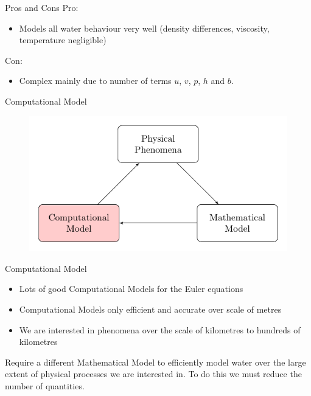 \documentclass[pdf]{beamer}
\begin{document}
\begin{frame}{Pros and Cons}
	Pro:
	\begin{itemize}
		\item Models all water behaviour very well (density differences, viscosity, temperature negligible)
	\end{itemize}
	Con:
	\begin{itemize}
		\item Complex mainly due to number of terms $u$, $v$, $p$, $h$ and $b$. 
	\end{itemize}
\end{frame}
\begin{frame}{Computational Model}
\begin{figure}
	\includegraphics[width=\textwidth]{./Pics/ModelDiagrams/FlowChartHigh3.pdf}
\end{figure}
\end{frame}
\begin{frame}{Computational Model}
	\begin{itemize}
		\item Lots of good Computational Models for the Euler equations
		\item Computational Models only efficient and accurate over scale of metres
		\item We are interested in phenomena over the scale of kilometres to hundreds of kilometres
	\end{itemize}
	Require a different Mathematical Model to efficiently model water over the large extent of physical processes we are interested in. To do this we must reduce the number of quantities.
\end{frame}
\end{document}
